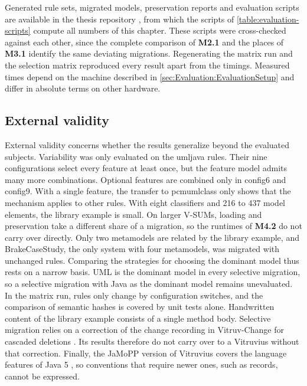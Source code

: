 Generated rule sets, migrated models, preservation reports and evaluation scripts are available in the thesis repository \cite{thesis-repo}, from which the scripts of \autoref{table:evaluation-scripts} compute all numbers of this chapter.
These scripts were cross-checked against each other, since the complete comparison of \textbf{M2.1} and the places of \textbf{M3.1} identify the same deviating migrations.
Regenerating the matrix run and the selection matrix reproduced every result apart from the timings.
Measured times depend on the machine described in \autoref{sec:Evaluation:EvaluationSetup} and differ in absolute terms on other hardware.

\subsection{External validity}
\label{sec:Evaluation:ThreatsToValidity:ExternalValidity}

External validity concerns whether the results generalize beyond the evaluated subjects.
Variability was only evaluated on the umljava rules.
Their nine configurations select every feature at least once, but the feature model admits many more combinations.
Optional features are combined only in config6 and config9.
With a single feature, the transfer to pcmumlclass only shows that the mechanism applies to other rules.
With eight classifiers and 216 to 437 model elements, the library example is small.
On larger V-SUMs, loading and preservation take a different share of a migration, so the runtimes of \textbf{M4.2} do not carry over directly.
Only two metamodels are related by the library example, and BrakeCaseStudy, the only system with four metamodels, was migrated with unchanged rules.
Comparing the strategies for choosing the dominant model thus rests on a narrow basis.
UML is the dominant model in every selective migration, so a selective migration with Java as the dominant model remains unevaluated.
In the matrix run, rules only change by configuration switches, and the comparison of semantic hashes is covered by unit tests alone.
Handwritten content of the library example consists of a single method body.
Selective migration relies on a correction of the change recording in Vitruv-Change for cascaded deletions \cite{vitruv-change-issue}.
Its results therefore do not carry over to a Vitruvius without that correction.
Finally, the JaMoPP version of Vitruvius covers the language features of Java 5 \cite{heidenreich2009closing}, so conventions that require newer ones, such as records, cannot be expressed.

